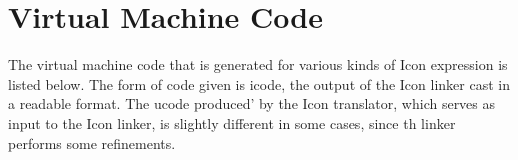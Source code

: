 \chapter{Virtual Machine Code}

The virtual machine code that is generated for various kinds of Icon
expression is listed below. The form of code given is icode, the
output of the Icon linker cast in a readable format. The ucode
produced' by the Icon translator, which serves as input to the Icon
linker, is slightly different in some cases, since th linker performs
some refinements.

